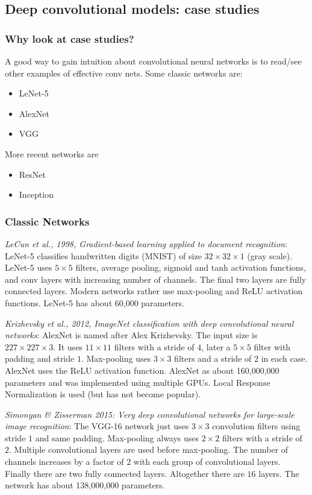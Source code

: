 \documentclass{article}
\begin{document}
\subsection{Deep convolutional models: case studies}
\subsubsection{Why look at case studies?}
A good way to gain intuition about convolutional neural networks is to read/see other examples of effective conv nets.
Some classic networks are:
\begin{itemize}
  \item LeNet-5
  \item AlexNet
  \item VGG
\end{itemize}
More recent networks are
\begin{itemize}
  \item ResNet
  \item Inception
\end{itemize}

\subsubsection{Classic Networks}
\emph{LeCun et al., 1998, Gradient-based learning applied to document recognition}:
LeNet-5 classifies handwritten digits (MNIST) of size $32\times 32\times 1$ (gray scale).
LeNet-5 uses $5\times 5$ filters, average pooling, sigmoid and tanh activation functions,
and conv layers with increasing number of channels.
The final two layers are fully connected layers.
Modern networks rather use max-pooling and ReLU activation functions.
LeNet-5 has about 60,000 parameters.

\emph{Krizhevsky et al., 2012, ImageNet classification with deep convolutional neural networks}:
AlexNet is named after Alex Krizhevsky.
The input size is $227\times 227\times 3$.
It uses $11\times 11$ filters with a stride of $4$, later a $5\times 5$ filter with padding and stride $1$.
Max-pooling uses $3\times 3$ filters and a stride of $2$ in each case.
AlexNet uses the ReLU activation function.
AlexNet as about 160,000,000 parameters and was implemented using multiple GPUs.
Local Response Normalization is used (but has not become popular).

\emph{Simonyan \& Zisserman 2015: Very deep convolutional networks for large-scale image recognition}:
The VGG-16 network just uses $3\times 3$ convolution filters using stride $1$ and same padding.
Max-pooling always uses $2\times 2$ filters with a stride of $2$.
Multiple convolutional layers are used before max-pooling.
The number of channels increases by a factor of $2$ with each group of convolutional layers.
Finally there are two fully connected layers.
Altogether there are $16$ layers.
The network has about 138,000,000 parameters.
\end{document}
